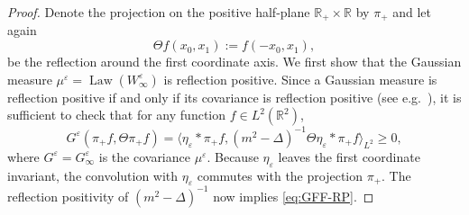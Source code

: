 \documentclass[11pt, a4paper]{scrartcl}
\numberwithin{equation}{section}
\theoremstyle{plain}
\theoremstyle{remark}
\newcommand{\assign}{:=}
\newcommand{\tmop}[1]{\ensuremath{\operatorname{#1}}}
\begin{document}
\begin{proof}
  Denote the projection on the positive half-plane $\mathbb{R}_+ \times
  \mathbb{R}$ by $\pi_+$ and let again
  \[ \Theta f (x_0, x_1) \assign f (- x_0, x_1), \]
  be the reflection around the first coordinate axis. We first show that the
  Gaussian measure $\mu^{\varepsilon} = \tmop{Law} (W_{\infty}^{\varepsilon})$
  is reflection positive. Since a Gaussian measure is reflection positive if
  and only if its covariance is reflection positive (see e.g.~{\cite[Theorem
  6.2.2.]{glimmQuantumPhysicsFunctional2012}}), it is sufficient to check that
  for any function $f \in L^2 (\mathbb{R}^2)$,
  \begin{equation}
    G^{\varepsilon} (\pi_+ f, \Theta \pi_+ f) = \langle \eta_{\varepsilon}
    \ast \pi_+ f, (m^2 - \Delta)^{- 1} \Theta \eta_{\varepsilon} \ast \pi_+ f
    \rangle_{L^2} \geqslant 0, \label{eq:GFF-RP}
  \end{equation}
  where $G^{\varepsilon} = G^{\varepsilon}_{\infty}$ is the covariance
  $\mu^{\varepsilon}$. Because $\eta_{\varepsilon}$ leaves the first
  coordinate invariant, the convolution with $\eta_{\varepsilon}$ commutes
  with the projection $\pi_+$. The reflection positivity of $(m^2 - \Delta)^{-
  1}$ now implies \eqref{eq:GFF-RP}.
  

\end{proof}
\end{document}
